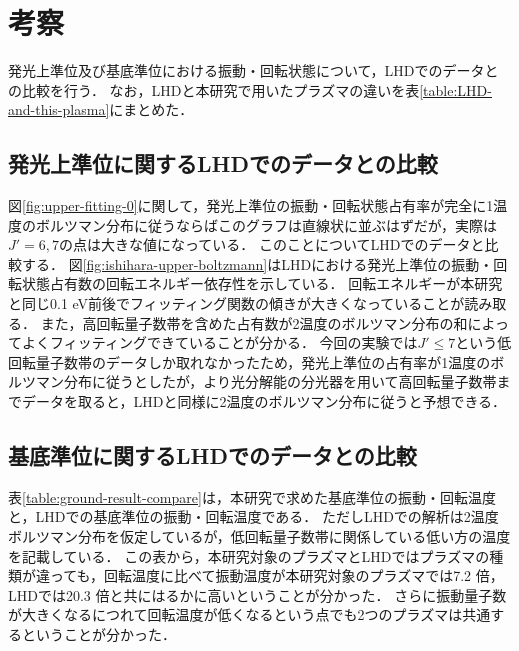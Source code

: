 \chapter{考察}
発光上準位及び基底準位における振動・回転状態について，LHDでのデータとの比較を行う．
なお，LHDと本研究で用いたプラズマの違いを表\ref{table:LHD-and-this-plasma}にまとめた\cite{ishihara}．

\section{発光上準位に関するLHDでのデータとの比較}
図\ref{fig:upper-fitting-0}に関して，発光上準位の振動・回転状態占有率が完全に1温度のボルツマン分布に従うならばこのグラフは直線状に並ぶはずだが，実際は$J'=6,7$の点は大きな値になっている．
このことについてLHDでのデータと比較する．
図\ref{fig:ishihara-upper-boltzmann}はLHDにおける発光上準位の振動・回転状態占有数の回転エネルギー依存性を示している\cite{ishihara}．
回転エネルギーが本研究と同じ0.1 eV前後でフィッティング関数の傾きが大きくなっていることが読み取る．
また，高回転量子数帯を含めた占有数が2温度のボルツマン分布の和によってよくフィッティングできていることが分かる．
今回の実験では$J' \leq 7$という低回転量子数帯のデータしか取れなかったため，発光上準位の占有率が1温度のボルツマン分布に従うとしたが，より光分解能の分光器を用いて高回転量子数帯までデータを取ると，LHDと同様に2温度のボルツマン分布に従うと予想できる．

\section{基底準位に関するLHDでのデータとの比較}
表\ref{table:ground-result-compare}は，本研究で求めた基底準位の振動・回転温度と，LHDでの基底準位の振動・回転温度\cite{ishihara}である．
ただしLHDでの解析は2温度ボルツマン分布を仮定しているが，低回転量子数帯に関係している低い方の温度を記載している．
この表から，本研究対象のプラズマとLHDではプラズマの種類が違っても，回転温度に比べて振動温度が本研究対象のプラズマでは7.2 倍，LHDでは20.3 倍と共にはるかに高いということが分かった．
さらに振動量子数が大きくなるにつれて回転温度が低くなるという点でも2つのプラズマは共通するということが分かった．